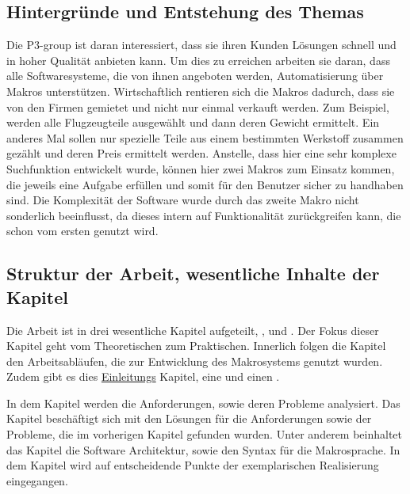   \subsection{Hintergründe und Entstehung des Themas}
  \label{ssec:Hintergründe und Entstehung des Themas}
    Die P3-group ist daran interessiert, dass sie ihren Kunden Lösungen schnell und in hoher Qualität anbieten kann. Um dies zu erreichen arbeiten sie daran, dass alle Softwaresysteme, die von ihnen angeboten werden, Automatisierung über Makros unterstützen. Wirtschaftlich rentieren sich die Makros dadurch, dass sie von den Firmen gemietet und nicht nur einmal verkauft werden. Zum Beispiel, werden alle Flugzeugteile ausgewählt und dann deren Gewicht ermittelt. Ein anderes Mal sollen nur spezielle Teile aus einem bestimmten Werkstoff zusammen gezählt und deren Preis ermittelt werden. Anstelle, dass hier eine sehr komplexe Suchfunktion entwickelt wurde, können hier zwei Makros zum Einsatz kommen, die jeweils eine Aufgabe erfüllen und somit für den Benutzer sicher zu handhaben sind. Die Komplexität der Software wurde durch das zweite Makro nicht sonderlich beeinflusst, da dieses intern auf Funktionalität zurückgreifen kann, die schon vom ersten genutzt wird.

  \subsection{Struktur der Arbeit, wesentliche Inhalte der Kapitel}
  \label{ssec:Struktur der Arbeit, wesentliche Inhalte der Kapitel}
    Die Arbeit ist in drei wesentliche Kapitel aufgeteilt, ,  und . Der Fokus dieser Kapitel geht vom Theoretischen zum Praktischen. Innerlich folgen die Kapitel den Arbeitsabläufen, die zur Entwicklung des Makrosystems genutzt wurden. Zudem gibt es dies \hyperref[sec:Einleitung]{Einleitungs} Kapitel, eine  und einen .

    In dem Kapitel  werden die Anforderungen, sowie deren Probleme analysiert. Das Kapitel  beschäftigt sich mit den Lösungen für die Anforderungen sowie der Probleme, die im vorherigen Kapitel gefunden wurden. Unter anderem beinhaltet das Kapitel die Software Architektur, sowie den Syntax für die Makrosprache. In dem Kapitel  wird auf entscheidende Punkte der exemplarischen Realisierung eingegangen.

